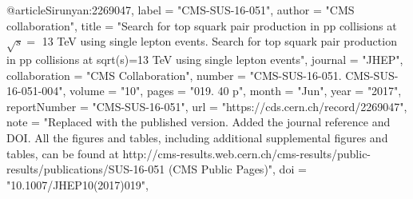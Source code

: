 @article{Sirunyan:2269047,
      label          = "CMS-SUS-16-051",
      author        = "{CMS collaboration}",
      title         = "{Search for top squark pair production in pp collisions at
                       $ \sqrt{s} = $ 13 TeV using single lepton events. Search
                       for top squark pair production in pp collisions at
                       sqrt(s)=13 TeV using single lepton events}",
      journal       = "JHEP",
      collaboration = "CMS Collaboration",
      number        = "CMS-SUS-16-051. CMS-SUS-16-051-004",
      volume        = "10",
      pages         = "019. 40 p",
      month         = "Jun",
      year          = "2017",
      reportNumber  = "CMS-SUS-16-051",
      url           = "https://cds.cern.ch/record/2269047",
      note          = "Replaced with the published version. Added the journal
                       reference and DOI. All the figures and tables, including
                       additional supplemental figures and tables, can be found at
                       http://cms-results.web.cern.ch/cms-results/public-results/publications/SUS-16-051
                       (CMS Public Pages)",
      doi           = "10.1007/JHEP10(2017)019",
}

